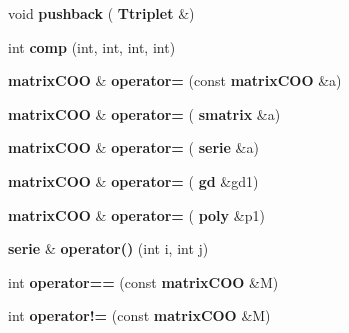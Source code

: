 \begin{DoxyCompactItemize}
void {\bfseries pushback} (\textbf{ Ttriplet} \&)
\item 
\mbox{\label{classmmgd_1_1matrix_c_o_o_a91077ca390ee143d48680bfbeb4b9eff}} 
int {\bfseries comp} (int, int, int, int)
\item 
\mbox{\label{classmmgd_1_1matrix_c_o_o_a3f3db54d10e2bc36c882f5927e7639fe}} 
\textbf{ matrix\+C\+OO} \& {\bfseries operator=} (const \textbf{ matrix\+C\+OO} \&a)
\item 
\mbox{\label{classmmgd_1_1matrix_c_o_o_a5bc948881046c07cbc56bd0aa5c00188}} 
\textbf{ matrix\+C\+OO} \& {\bfseries operator=} (\textbf{ smatrix} \&a)
\item 
\mbox{\label{classmmgd_1_1matrix_c_o_o_a66da295e263d4e2c02d8661f62ed0b50}} 
\textbf{ matrix\+C\+OO} \& {\bfseries operator=} (\textbf{ serie} \&a)
\item 
\mbox{\label{classmmgd_1_1matrix_c_o_o_a2acc6fe91c6f0a4c4d7ad077f94f7437}} 
\textbf{ matrix\+C\+OO} \& {\bfseries operator=} (\textbf{ gd} \&gd1)
\item 
\mbox{\label{classmmgd_1_1matrix_c_o_o_ae48852f1b002e4f7d578193d5e2f9e55}} 
\textbf{ matrix\+C\+OO} \& {\bfseries operator=} (\textbf{ poly} \&p1)
\item 
\textbf{ serie} \& \textbf{ operator()} (int i, int j)
\item 
\mbox{\label{classmmgd_1_1matrix_c_o_o_afe1e82f256aa34029da089c673f23f0e}} 
int {\bfseries operator==} (const \textbf{ matrix\+C\+OO} \&M)
\item 
\mbox{\label{classmmgd_1_1matrix_c_o_o_aee898c01c3bb5d2a010793d195fb0056}} 
int {\bfseries operator!=} (const \textbf{ matrix\+C\+OO} \&M)
\end{DoxyCompactItemize}
